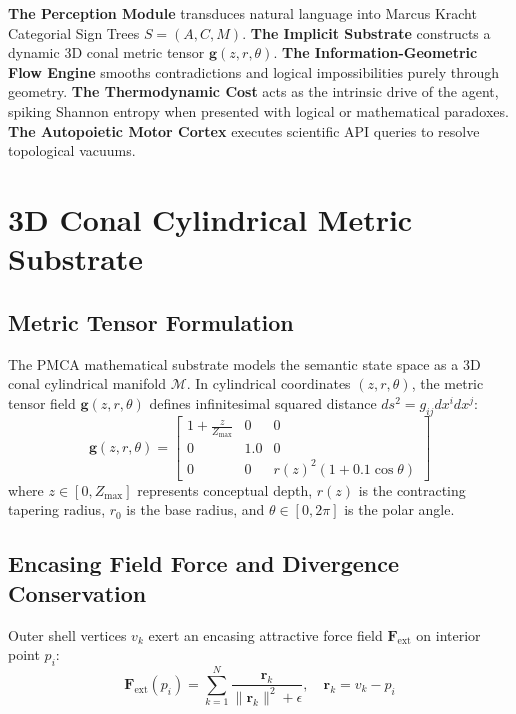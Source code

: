 \documentclass[12pt, a4paper]{article}
\begin{document}
\textbf{The Perception Module} transduces natural language into Marcus Kracht Categorial Sign Trees $S = (A, C, M)$.
\textbf{The Implicit Substrate} constructs a dynamic 3D conal metric tensor $\mathbf{g}(z, r, \theta)$.
\textbf{The Information-Geometric Flow Engine} smooths contradictions and logical impossibilities purely through geometry.
\textbf{The Thermodynamic Cost} acts as the intrinsic drive of the agent, spiking Shannon entropy when presented with logical or mathematical paradoxes.
\textbf{The Autopoietic Motor Cortex} executes scientific API queries to resolve topological vacuums.

\section{3D Conal Cylindrical Metric Substrate}

\subsection{Metric Tensor Formulation}
The PMCA mathematical substrate models the semantic state space as a 3D conal cylindrical manifold $\mathcal{M}$. In cylindrical coordinates $(z, r, \theta)$, the metric tensor field $\mathbf{g}(z, r, \theta)$ defines infinitesimal squared distance $ds^2 = g_{ij} dx^i dx^j$:
\begin{equation}
\mathbf{g}(z, r, \theta) = \begin{bmatrix} 1 + \frac{z}{Z_{\text{max}}} & 0 & 0 \\ 0 & 1.0 & 0 \\ 0 & 0 & r(z)^2 (1 + 0.1 \cos\theta) \end{bmatrix}
\end{equation}
where $z \in [0, Z_{\text{max}}]$ represents conceptual depth, $r(z)$ is the contracting tapering radius, $r_0$ is the base radius, and $\theta \in [0, 2\pi]$ is the polar angle.

\subsection{Encasing Field Force and Divergence Conservation}
Outer shell vertices $v_k$ exert an encasing attractive force field $\mathbf{F}_{\text{ext}}$ on interior point $p_i$:
\begin{equation}
\mathbf{F}_{\text{ext}}(p_i) = \sum_{k=1}^N \frac{\mathbf{r}_k}{\|\mathbf{r}_k\|^2 + \epsilon}, \quad \mathbf{r}_k = v_k - p_i
\end{equation}
\end{document}
